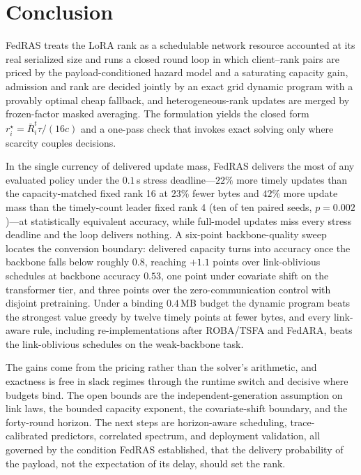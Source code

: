 \documentclass[a4paper,fleqn]{cas-dc}
\begin{document}
\section{Conclusion}
\label{sec:conclusion}
FedRAS treats the LoRA rank as a schedulable network resource accounted at its real serialized size and runs a closed round loop in which client--rank pairs are priced by the payload-conditioned hazard model and a saturating capacity gain, admission and rank are decided jointly by an exact grid dynamic program with a provably optimal cheap fallback, and heterogeneous-rank updates are merged by frozen-factor masked averaging. The formulation yields the closed form $r_i^\star=\bar R_i^t\tau/(16c)$ and a one-pass check that invokes exact solving only where scarcity couples decisions.
\par
In the single currency of delivered update mass, FedRAS delivers the most of any evaluated policy under the $0.1$\,s stress deadline---$22\%$ more timely updates than the capacity-matched fixed rank 16 at $23\%$ fewer bytes and $42\%$ more update mass than the timely-count leader fixed rank 4 (ten of ten paired seeds, $p=0.002$)---at statistically equivalent accuracy, while full-model updates miss every stress deadline and the loop delivers nothing. A six-point backbone-quality sweep locates the conversion boundary: delivered capacity turns into accuracy once the backbone falls below roughly $0.8$, reaching $+1.1$ points over link-oblivious schedules at backbone accuracy $0.53$, one point under covariate shift on the transformer tier, and three points over the zero-communication control with disjoint pretraining. Under a binding $0.4$\,MB budget the dynamic program beats the strongest value greedy by twelve timely points at fewer bytes, and every link-aware rule, including re-implementations after ROBA/TSFA and FedARA, beats the link-oblivious schedules on the weak-backbone task.
\par
The gains come from the pricing rather than the solver's arithmetic, and exactness is free in slack regimes through the runtime switch and decisive where budgets bind. The open bounds are the independent-generation assumption on link laws, the bounded capacity exponent, the covariate-shift boundary, and the forty-round horizon. The next steps are horizon-aware scheduling, trace-calibrated predictors, correlated spectrum, and deployment validation, all governed by the condition FedRAS established, that the delivery probability of the payload, not the expectation of its delay, should set the rank.
\par
\end{document}
